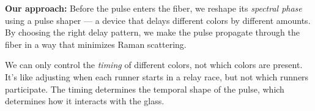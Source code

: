 \documentclass[12pt,a4paper]{article}
\begin{document}
\textbf{Our approach:} Before the pulse enters the fiber, we reshape its \emph{spectral phase} using a pulse shaper --- a device that delays different colors by different amounts. By choosing the right delay pattern, we make the pulse propagate through the fiber in a way that minimizes Raman scattering.

\begin{intuition}
We can only control the \emph{timing} of different colors, not which colors are present. It's like adjusting when each runner starts in a relay race, but not which runners participate. The timing determines the temporal shape of the pulse, which determines how it interacts with the glass.
\end{intuition}


\end{document}
